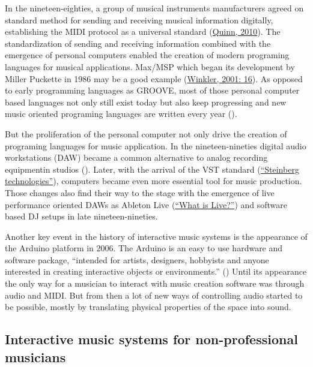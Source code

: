 In the nineteen-eighties, a group of musical instruments manufacturers agreed on standard method for sending and receiving musical information digitally, establishing the MIDI protocol as a universal standard (\href{http://www.insidetechnology360.com/index.php/the-history-of-midi-8862/}{Quinn, 2010}). The standardization of sending and receiving information combined with the emergence of personal computers enabled the creation of modern programing languages for musical applications. Max/MSP which began its development by Miller Puckette in 1986 may be a good example (\href{http://blog.lib.umn.edu/geers001/emusic/14_assig_ComposingInteractiveMusicCh1-2.pdf}{Winkler, 2001: 16}). As opposed to early programming languages as GROOVE, most of those personal computer based languages not only still exist today but also keep progressing and new music oriented programing languages are written every year ().

But the proliferation of the personal computer not only drive the creation of programing languages for music application. In the nineteen-nineties digital audio workstations (DAW) became a common alternative to analog recording equipmentin studios (). Later, with the arrival of the VST standard (\href{http://www.steinberg.net/en/company/technologies.html}{``Steinberg technologies''}), computers became even more essential tool for music production. Those changes also find their way to the stage with the emergence of live performance oriented DAWs as Ableton Live (\href{https://www.ableton.com/en/live/}{``What is Live?''}) and software based DJ setups in late nineteen-nineties.

Another key event in the history of interactive music systems is the appearance of the Arduino platform in 2006. The Arduino is an easy to use hardware and software package, ``intended for artists, designers, hobbyists and anyone interested in creating interactive objects or environments.'' () Until its appearance the only way for a musician to interact with music creation software was through audio and MIDI. But from then a lot of new ways of controlling audio started to be possible, mostly by translating physical properties of the space into sound.

\subsection{Interactive music systems for non-professional musicians}

